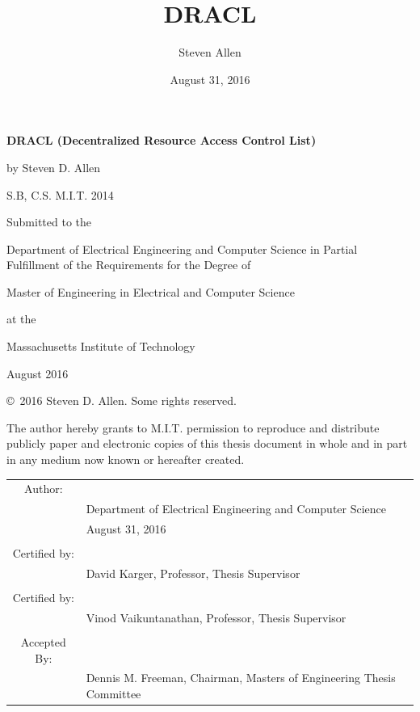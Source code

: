 \documentclass[pdftex,12pt,a4papaer,twoside,notitlepage]{report}
\title{DRACL}
\author{Steven Allen}
\date{August 31, 2016}
\begin{document}

\begin{titlingpage}

  \begin{singlespacing}

    \setlength{\parskip}{1em}
    \begin{center}

      \textbf{DRACL (Decentralized Resource Access Control List)}

      by Steven D. Allen

      S.B, C.S. M.I.T. 2014

      \vspace{2em}

      Submitted to the

      Department of Electrical Engineering and Computer Science in
      Partial Fulfillment of the Requirements for the Degree of

      Master of Engineering in Electrical and Computer Science

      at the

      Massachusetts Institute of Technology

      August 2016

      \copyright~2016 Steven D. Allen. Some rights reserved.

      The author hereby grants to M.I.T. permission to reproduce and distribute
      publicly paper and electronic copies of this thesis document in whole and in
      part in any medium now known or hereafter created.

      \vspace{3em}
      \begin{tabular}{c l}
        Author: & \hrulefill \\
                & {\small Department of Electrical Engineering and Computer Science } \\
                & {\small August 31, 2016 } \\
        \\
        Certified by: & \hrulefill \\
                & {\small David Karger, Professor, Thesis Supervisor } \\
        \\
        Certified by: & \hrulefill \\
                & {\small Vinod Vaikuntanathan, Professor, Thesis Supervisor } \\
        \\
        Accepted By: & \hrulefill \\
                & {\small Dennis M. Freeman, Chairman, Masters of Engineering Thesis Committee } \\
      \end{tabular}
    \end{center}

  \end{singlespacing}

\end{titlingpage}
\end{document}
